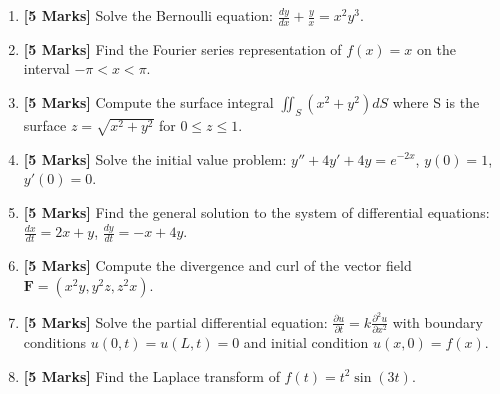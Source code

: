 \documentclass[11pt,a4paper]{article}
\begin{document}
\begin{enumerate}[label=\textbf{Q\arabic*.}, leftmargin=2em]
    \vspace{1em}

    \item \textbf{[5 Marks]} Solve the Bernoulli equation: $\frac{dy}{dx} + \frac{y}{x} = x^2 y^3$.
    
    \vspace{1em}

    \item \textbf{[5 Marks]} Find the Fourier series representation of $f(x) = x$ on the interval $-\pi < x < \pi$.
    
    \vspace{1em}

    \item \textbf{[5 Marks]} Compute the surface integral $\iint_S (x^2 + y^2)dS$ where S is the surface $z = \sqrt{x^2 + y^2}$ for $0 \leq z \leq 1$.
    
    \vspace{1em}

    \item \textbf{[5 Marks]} Solve the initial value problem: $y'' + 4y' + 4y = e^{-2x}$, $y(0) = 1$, $y'(0) = 0$.
    
    \vspace{1em}

    \item \textbf{[5 Marks]} Find the general solution to the system of differential equations: $\frac{dx}{dt} = 2x + y$, $\frac{dy}{dt} = -x + 4y$.
    
    \vspace{1em}

    \item \textbf{[5 Marks]} Compute the divergence and curl of the vector field $\mathbf{F} = (x^2 y, y^2 z, z^2 x)$.
    
    \vspace{1em}

    \item \textbf{[5 Marks]} Solve the partial differential equation: $\frac{\partial u}{\partial t} = k \frac{\partial^2 u}{\partial x^2}$ with boundary conditions $u(0,t) = u(L,t) = 0$ and initial condition $u(x,0) = f(x)$.
    
    \vspace{1em}

    \item \textbf{[5 Marks]} Find the Laplace transform of $f(t) = t^2 \sin(3t)$.
    
    \vspace{1em}


\end{enumerate}
\end{document}
